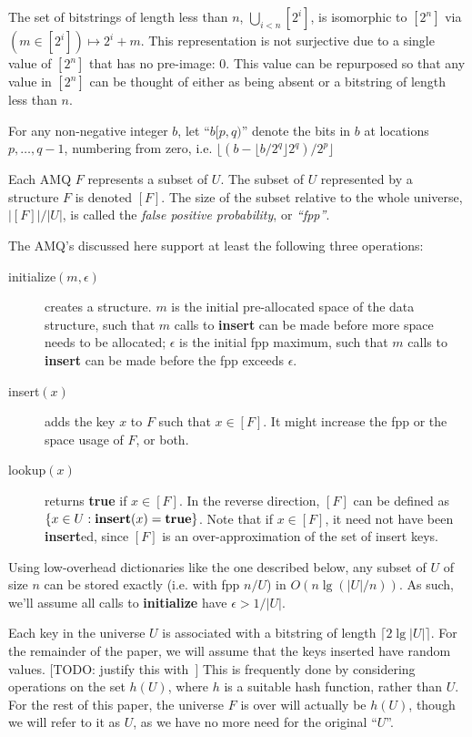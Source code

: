 \documentclass[11pt,letterpaper]{article}
\begin{document}
The set of bitstrings of length less than $n$,  $\bigcup_{i < n} [2^i]$, is isomorphic to $[2^n]$ via $(m \in [2^i]) \mapsto 2^i + m$.
This representation is not surjective due to a single value of $[2^n]$ that has no pre-image: $0$.
This value can be repurposed so that any value in $[2^n]$ can be thought of either as being absent or a bitstring of length less than $n$.

For any non-negative integer $b$, let ``$b[p,q)$'' denote the bits in $b$ at locations $p, \dots, q-1$, numbering from zero, i.e. $\lfloor (b - \lfloor b/2^q \rfloor 2^q)/2^p \rfloor$

Each AMQ $F$ represents a subset of $U$.
The subset of $U$ represented by a structure $F$ is denoted $[F]$.
The size of the subset relative to the whole universe, $|[F]|/|U|$, is called the {\em false positive probability}, or {\em ``fpp''}.

The AMQ's discussed here support at least the following three operations:

\begin{description}
\item[initialize$(m, \epsilon)$] creates a structure.
  $m$ is the initial pre-allocated space of the data structure, such that $m$ calls to {\bf insert} can be made before more space needs to be allocated;
  $\epsilon$ is the initial fpp maximum, such that $m$ calls to {\bf insert} can be made before the fpp exceeds $\epsilon$.
\item[insert$(x)$] adds the key $x$ to $F$ such that $x \in [F]$.
  It might increase the fpp or the space usage of $F$, or both.
\item[lookup$(x)$] returns {\bf true} if $x \in [F]$.
  In the reverse direction, $[F]$ can be defined as $\{x \in U : {\bf insert}(x) = {\bf true}\}$.
  Note that if $x \in [F]$, it need not have been {\bf insert}ed, since $[F]$ is an over-approximation of the set of insert keys.
\end{description}

Using low-overhead dictionaries like the one described below, any subset of $U$ of size $n$ can be stored exactly (i.e. with fpp $n/U$) in $O(n \lg (|U|/n))$.
As such, we'll assume all calls to {\bf initialize} have $\epsilon > 1/|U|$.

Each key in the universe $U$ is associated with a bitstring of length $\lceil 2 \lg |U| \rceil$.
For the remainder of the paper, we will assume that the keys inserted have random values.
[TODO: justify this with~\cite{mitzenmacher2008simple}]
This is frequently done by considering operations on the set $h(U)$, where $h$ is a suitable hash function, rather than $U$.
For the rest of this paper, the universe $F$ is over will actually be $h(U)$, though we will refer to it as $U$, as we have no more need for the original ``$U$''.
\end{document}

